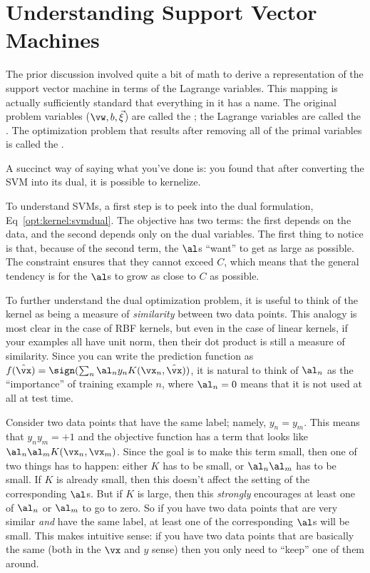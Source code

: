 \section{Understanding Support Vector Machines}

The prior discussion involved quite a bit of math to derive a
representation of the support vector machine in terms of the Lagrange
variables.  This mapping is actually sufficiently standard that
everything in it has a name.  The original problem variables
($\vw,b,\vec\xi$) are called the ; the
Lagrange variables are called the .  The
optimization problem that results after removing all of the primal
variables is called the .

A succinct way of saying what you've done is: you found that after
converting the SVM into its dual, it is possible to kernelize.

To understand SVMs, a first step is to peek into the dual formulation,
Eq~\eqref{opt:kernel:svmdual}.  The objective has two terms: the first
depends on the data, and the second depends only on the dual
variables.  The first thing to notice is that, because of the second
term, the $\al$s ``want'' to get as large as possible.  The constraint
ensures that they cannot exceed $C$, which means that the general
tendency is for the $\al$s to grow as close to $C$ as possible.

To further understand the dual optimization problem, it is useful to
think of the kernel as being a measure of \emph{similarity} between
two data points.  This analogy is most clear in the case of RBF
kernels, but even in the case of linear kernels, if your examples all
have unit norm, then their dot product is still a measure of
similarity.  Since you can write the prediction function as $f(\hat \vx)
= \sign( \sum_n \al_n y_n K(\vx_n,\hat \vx) )$, it is natural to think
of $\al_n$ as the ``importance'' of training example $n$, where $\al_n
= 0$ means that it is not used at all at test time.

Consider two data points that have the same label; namely, $y_n =
y_m$.  This means that $y_n y_m = +1$ and the objective function has a
term that looks like $\al_n \al_m K(\vx_n, \vx_m)$.  Since the goal is to
make this term small, then one of two things has to happen: either $K$
has to be small, or $\al_n \al_m$ has to be small.  If $K$ is already
small, then this doesn't affect the setting of the corresponding
$\al$s.  But if $K$ is large, then this \emph{strongly} encourages at
least one of $\al_n$ or $\al_m$ to go to zero.  So if you have two
data points that are very similar \emph{and} have the same label, at
least one of the corresponding $\al$s will be small.  This makes
intuitive sense: if you have two data points that are basically the
same (both in the $\vx$ and $y$ sense) then you only need to ``keep''
one of them around.

